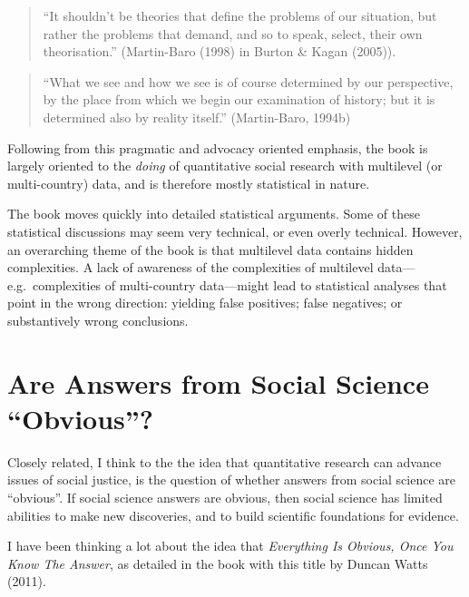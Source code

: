 \documentclass[
  letterpaper,
  DIV=11,
  numbers=noendperiod]{scrreprt}
\begin{document}
\begin{quote}
``It shouldn't be theories that define the problems of our situation,
but rather the problems that demand, and so to speak, select, their own
theorisation.'' (Martin-Baro (1998) in Burton \& Kagan (2005)).
\end{quote}

\begin{quote}
``What we see and how we see is of course determined by our perspective,
by the place from which we begin our examination of history; but it is
determined also by reality itself.'' (Martin-Baro, 1994b)
\end{quote}

Following from this pragmatic and advocacy oriented emphasis, the book
is largely oriented to the \emph{doing} of quantitative social research
with multilevel (or multi-country) data, and is therefore mostly
statistical in nature.

The book moves quickly into detailed statistical arguments. Some of
these statistical discussions may seem very technical, or even overly
technical. However, an overarching theme of the book is that multilevel
data contains hidden complexities. A lack of awareness of the
complexities of multilevel data---e.g.~complexities of multi-country
data---might lead to statistical analyses that point in the wrong
direction: yielding false positives; false negatives; or substantively
wrong conclusions.

\section{Are Answers from Social Science
``Obvious''?}\label{are-answers-from-social-science-obvious}

Closely related, I think to the the idea that quantitative research can
advance issues of social justice, is the question of whether answers
from social science are ``obvious''. If social science answers are
obvious, then social science has limited abilities to make new
discoveries, and to build scientific foundations for evidence.

I have been thinking a lot about the idea that \emph{Everything Is
Obvious, Once You Know The Answer}, as detailed in the book with this
title by Duncan Watts (2011). 
\end{document}
